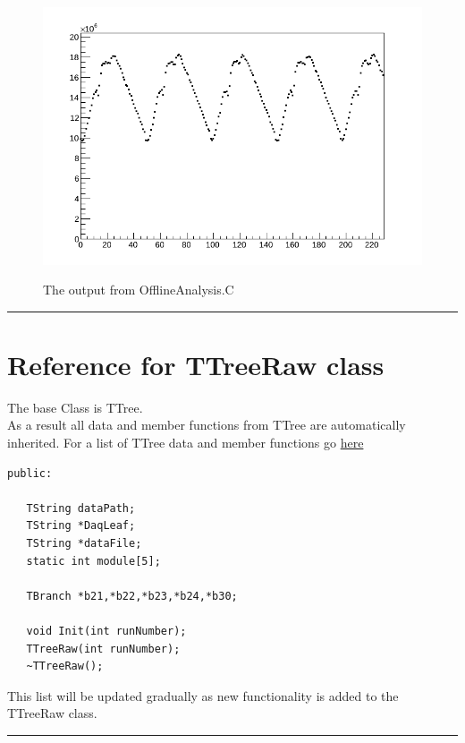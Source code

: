 \documentclass[12pt]{article}
\begin{document}
\begin{figure}[htb]
\centering
\includegraphics[width=6in]{OfflineAnalysis.png}\\
\caption{The output from OfflineAnalysis.C}\label{f6}
\end{figure}

\noindent
{\color{red} \rule{\linewidth}{1mm} }
 
\newpage
\section{Reference for TTreeRaw class}
The base Class is  TTree.\\
As a result all data and member functions from TTree are automatically inherited. For a list of TTree data and member functions go \href{https://root.cern.ch/root/html/TTree.html}{here}
\begin{lstlisting}
public:

   TString dataPath;
   TString *DaqLeaf;
   TString *dataFile;
   static int module[5];

   TBranch *b21,*b22,*b23,*b24,*b30;

   void Init(int runNumber);
   TTreeRaw(int runNumber);
   ~TTreeRaw();

\end{lstlisting}
This list will be updated gradually as new functionality is added to the TTreeRaw class.

\noindent
{\color{red} \rule{\linewidth}{1mm} }

\newpage
\end{document}
